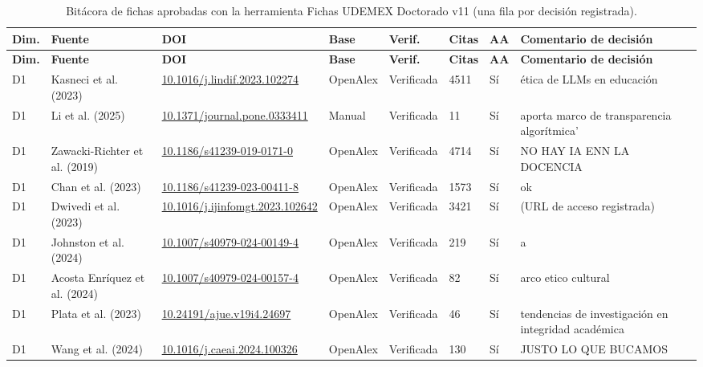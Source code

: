 {\footnotesize\setlength{\tabcolsep}{4pt}
\begin{longtable}{|p{0.55cm}|p{2.6cm}|p{2.8cm}|p{1.3cm}|p{1.6cm}|p{0.8cm}|p{0.45cm}|p{2.4cm}|}
\caption{Bitácora de fichas aprobadas con la herramienta Fichas UDEMEX Doctorado v11 (una fila por decisión registrada).}\label{tab:bitacora-corpus}\\
\hline
\rowcolor{bgCotejo}
\textbf{Dim.} & \textbf{Fuente} & \textbf{DOI} & \textbf{Base} & \textbf{Verif.} & \textbf{Citas} & \textbf{AA} & \textbf{Comentario de decisión} \\
\hline
\endfirsthead
\hline
\rowcolor{bgCotejo}
\textbf{Dim.} & \textbf{Fuente} & \textbf{DOI} & \textbf{Base} & \textbf{Verif.} & \textbf{Citas} & \textbf{AA} & \textbf{Comentario de decisión} \\
\hline
\endhead
D1 & Kasneci et al. (2023) & {\scriptsize \url{10.1016/j.lindif.2023.102274}} & OpenAlex & Verificada & 4511 & Sí & ética de LLMs en educación \\
\hline
D1 & Li et al. (2025) & {\scriptsize \url{10.1371/journal.pone.0333411}} & Manual & Verificada & 11 & Sí & aporta marco de transparencia algorítmica' \\
\hline
D1 & Zawacki-Richter et al. (2019) & {\scriptsize \url{10.1186/s41239-019-0171-0}} & OpenAlex & Verificada & 4714 & Sí & NO HAY IA ENN LA DOCENCIA \\
\hline
D1 & Chan et al. (2023) & {\scriptsize \url{10.1186/s41239-023-00411-8}} & OpenAlex & Verificada & 1573 & Sí & ok \\
\hline
D1 & Dwivedi et al. (2023) & {\scriptsize \url{10.1016/j.ijinfomgt.2023.102642}} & OpenAlex & Verificada & 3421 & Sí & (URL de acceso registrada) \\
\hline
D1 & Johnston et al. (2024) & {\scriptsize \url{10.1007/s40979-024-00149-4}} & OpenAlex & Verificada & 219 & Sí & a \\
\hline
D1 & Acosta Enríquez et al. (2024) & {\scriptsize \url{10.1007/s40979-024-00157-4}} & OpenAlex & Verificada & 82 & Sí & arco etico cultural \\
\hline
D1 & Plata et al. (2023) & {\scriptsize \url{10.24191/ajue.v19i4.24697}} & OpenAlex & Verificada & 46 & Sí & tendencias de investigación en integridad académica \\
\hline
D1 & Wang et al. (2024) & {\scriptsize \url{10.1016/j.caeai.2024.100326}} & OpenAlex & Verificada & 130 & Sí & JUSTO LO QUE BUCAMOS \\

\end{longtable}}

